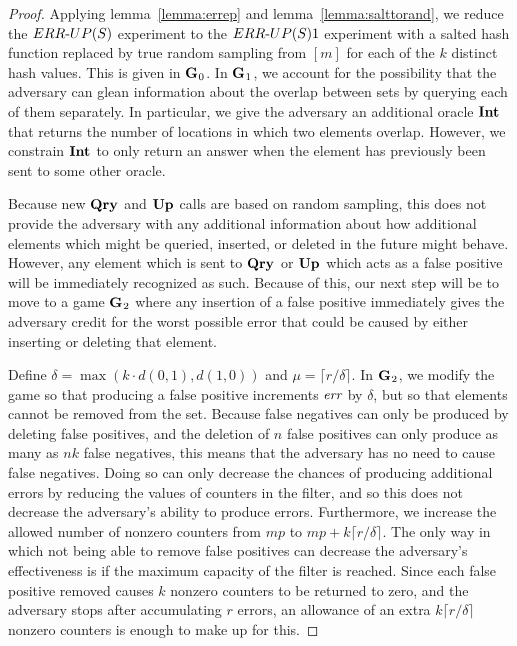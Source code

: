 \begin{proof}
Applying lemma~\ref{lemma:errep} and lemma~\ref{lemma:salttorand}, we reduce the
${ERR\mbox{-}UP(S)}$ experiment to the ${ERR\mbox{-}UP(S)}1$ experiment with a salted hash function
replaced by true random sampling from $[m]$ for each of the $k$ distinct hash
values. This is given in $\textup{\textbf{G}}\hspace{0.5pt}_0$. In $\textup{\textbf{G}}\hspace{0.5pt}_1$, we account for the possibility
that the adversary can glean information about the overlap between sets by
querying each of them separately. In particular, we give the adversary an
additional oracle $\textup{\textbf{Int}}\hspace{0.5pt}$ that returns the number of locations in which two
elements overlap. However, we constrain $\textup{\textbf{Int}}\hspace{0.5pt}$ to only return an answer when
the element has previously been sent to some other oracle.

Because new $\textup{\textbf{Qry}}\hspace{0.5pt}$ and $\textup{\textbf{Up}}\hspace{0.5pt}$ calls are based on random sampling, this does not
provide the adversary with any additional information about how additional
elements which might be queried, inserted, or deleted in the future might
behave. However, any element which is sent to $\textup{\textbf{Qry}}\hspace{0.5pt}$ or $\textup{\textbf{Up}}\hspace{0.5pt}$ which acts as a
false positive will be immediately recognized as such. Because of this, our next
step will be to move to a game $\textup{\textbf{G}}\hspace{0.5pt}_2$ where any insertion of a false positive
immediately gives the adversary credit for the worst possible error that could
be caused by either inserting or deleting that element.

Define $\delta = \max(k \cdot d(0,1), d(1,0))$ and $\mu = \lceil r/\delta
\rceil$. In $\textup{\textbf{G}}\hspace{0.5pt}_2$, we modify the game so that producing a false positive
increments $\textit{err}$ by $\delta$, but so that elements cannot be removed from the
set. Because false negatives can only be produced by deleting false positives,
and the deletion of $n$ false positives can only produce as many as $nk$ false
negatives, this means that the adversary has no need to cause false negatives.
Doing so can only decrease the chances of producing additional errors by
reducing the values of counters in the filter, and so this does not decrease the
adversary's ability to produce errors. Furthermore, we increase the allowed
number of nonzero counters from $mp$ to $mp + k\lceil r/\delta \rceil$. The only
way in which not being able to remove false positives can decrease the
adversary's effectiveness is if the maximum capacity of the filter is reached.
Since each false positive removed causes $k$ nonzero counters to be returned to
zero, and the adversary stops after accumulating $r$ errors, an allowance of an
extra $k\lceil r/\delta \rceil$ nonzero counters is enough to make up for this.


\end{proof}
